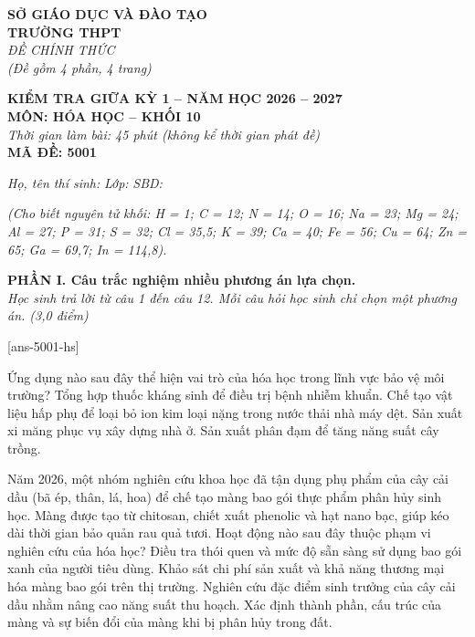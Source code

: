 \documentclass[11pt,a4paper]{article}
\begin{document}
\begin{minipage}[t]{0.45\textwidth}
\textbf{SỞ GIÁO DỤC VÀ ĐÀO TẠO}\\
\textbf{TRƯỜNG THPT}\\
\textit{ĐỀ CHÍNH THỨC}\\
\textit{(Đề gồm 4 phần, 4 trang)}
\end{minipage}
\hfill
\begin{minipage}[t]{0.52\textwidth}
\raggedleft
\textbf{\color{hfRed}KIỂM TRA GIỮA KỲ 1 -- NĂM HỌC 2026 -- 2027}\\
\textbf{MÔN: HÓA HỌC -- KHỐI 10}\\
\textit{Thời gian làm bài: 45 phút (không kể thời gian phát đề)}\\
\textbf{MÃ ĐỀ: 5001}
\end{minipage}

\vspace{3pt}
\noindent
\textit{Họ, tên thí sinh:} \dotfill \textit{Lớp:} \dotfill \textit{SBD:} \dotfill

\vspace{2pt}
\noindent
\textit{\footnotesize (Cho biết nguyên tử khối: H = 1; C = 12; N = 14; O = 16; Na = 23; Mg = 24; Al = 27; P = 31; S = 32; Cl = 35,5; K = 39; Ca = 40; Fe = 56; Cu = 64; Zn = 65; Ga = 69,7; In = 114,8).}

\vspace{2pt}
\noindent
\textbf{\color{mainGreen}PHẦN I. Câu trắc nghiệm nhiều phương án lựa chọn.}\\
\textit{Học sinh trả lời từ câu 1 đến câu 12. Mỗi câu hỏi học sinh chỉ chọn một phương án. (3,0 điểm)}

[ans-5001-hs]

\begin{ex}
Ứng dụng nào sau đây thể hiện vai trò của hóa học trong lĩnh vực bảo vệ môi trường?
\choice
{Tổng hợp thuốc kháng sinh để điều trị bệnh nhiễm khuẩn.}
{\True Chế tạo vật liệu hấp phụ để loại bỏ ion kim loại nặng trong nước thải nhà máy dệt.}
{Sản xuất xi măng phục vụ xây dựng nhà ở.}
{Sản xuất phân đạm để tăng năng suất cây trồng.}

\end{ex}

\begin{ex}
Năm 2026, một nhóm nghiên cứu khoa học đã tận dụng phụ phẩm của cây cải dầu (bã ép, thân, lá, hoa) để chế tạo màng bao gói thực phẩm phân hủy sinh học. Màng được tạo từ chitosan, chiết xuất phenolic và hạt nano bạc, giúp kéo dài thời gian bảo quản rau quả tươi. Hoạt động nào sau đây thuộc phạm vi nghiên cứu của hóa học?
\choice
{Điều tra thói quen và mức độ sẵn sàng sử dụng bao gói xanh của người tiêu dùng.}
{Khảo sát chi phí sản xuất và khả năng thương mại hóa màng bao gói trên thị trường.}
{Nghiên cứu đặc điểm sinh trưởng của cây cải dầu nhằm nâng cao năng suất thu hoạch.}
{\True Xác định thành phần, cấu trúc của màng và sự biến đổi của màng khi bị phân hủy trong đất.}

\end{ex}
\end{document}
